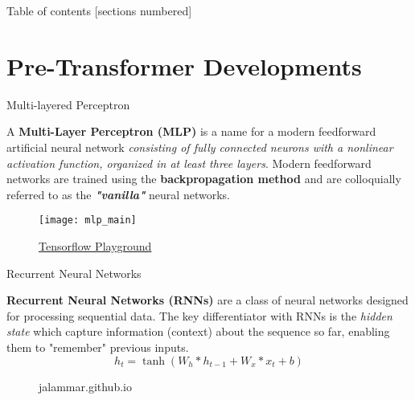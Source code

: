 \documentclass[10pt]{beamer}
\begin{document}
\begin{frame}{Table of contents}
	[sections numbered]
	\tableofcontents%
\end{frame}

\section[Pre-Transformer Developments]{Pre-Transformer Developments}

\begin{frame}[fragile]{ Multi-layered Perceptron }

	A \textbf{Multi-Layer Perceptron (MLP)} is a name for a modern feedforward artificial neural network
	\textit{consisting of fully connected neurons with a nonlinear activation function, organized in at least three
		layers}. Modern feedforward networks are trained using the \textbf{backpropagation method} and are
	colloquially referred to as the \textit{\textbf{"vanilla"}} neural networks.

	\begin{figure}[h]
		\centering
		\texttt{[image: mlp\_main]}
		\caption{
			\href{https://playground.tensorflow.org/}{Tensorflow Playground}
		}
	\end{figure}

\end{frame}

\begin{frame}[fragile]{Recurrent Neural Networks }

	\textbf{Recurrent Neural Networks (RNNs)} are a class of neural networks designed for processing sequential
	data. The key differentiator with RNNs is the \textit{hidden state} which capture information (context) about
	the sequence so far, enabling them to "remember" previous inputs.
	\begin{equation}
		h_t = \tanh(W_h * h_{t-1} + W_x * x_t + b)
	\end{equation}

	\begin{figure}[h]
		\centering
		\caption{jalammar.github.io}
	\end{figure}

\end{frame}
\end{document}
